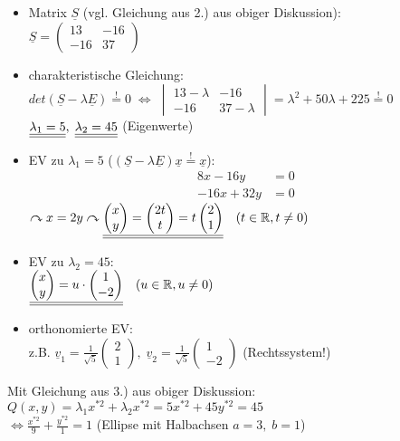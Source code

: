 \begin{itemize}
\item Matrix $\underline{S}$ (vgl. Gleichung aus 2.) aus obiger Diskussion):\\
$\underline{S}=\begin{pmatrix}
13 & -16\\
-16 & 37
\end{pmatrix}$
\item charakteristische Gleichung: \\
$det(\underline{S}-\lambda\underline{E})\overset{!}{=}0 \; \Leftrightarrow \; \begin{vmatrix}
13-\lambda & -16\\
-16 & 37-\lambda
\end{vmatrix}=\lambda^2+50\lambda+225\overset{!}{=}0$\\
$\underline{\underline{\lambda_1=5}}, \; \underline{\underline{\lambda_2 = 45}}$ (Eigenwerte)
\item EV zu $\lambda_1=5$ ($(\underline{S}-\lambda\underline{E})\underline{x}\overset{!}{=}\underline{x}$):
\begin{align*}
8x-16y &= 0\\
-16x+32y&=0
\end{align*}
$\curvearrowright x=2y \curvearrowright\underline{\underline{\begin{pmatrix}
x\\
y
\end{pmatrix}= \begin{pmatrix}
2t\\
t
\end{pmatrix}=t \begin{pmatrix}
2\\
1
\end{pmatrix}}} \quad (t \in \mathbb{R}, t\not = 0)$
\item EV zu $\lambda_2=45$:\\
$\underline{\underline{\begin{pmatrix}
x\\
y
\end{pmatrix}=u\cdot \begin{pmatrix}
1\\
-2
\end{pmatrix}}}\quad (u \in \mathbb{R}, u\not = 0)$
\item orthonomierte EV:\\
z.B. $\underline{v}_1=\frac{1}{\sqrt{5}}\begin{pmatrix}
2\\
1
\end{pmatrix}, \; \underline{v}_2=\frac{1}{\sqrt{5}}\begin{pmatrix}
1\\
-2
\end{pmatrix}$ (Rechtssystem!)
\end{itemize}
Mit Gleichung aus 3.) aus obiger Diskussion:\\
$Q(x,y)=\lambda_1x^{*2}+\lambda_2 x^{*2}=5x^{*2}+45y^{*2}=45$\\
$\Leftrightarrow \boxed{\frac{x^{*2}}{9}+\frac{y^{*2}}{1}=1}$ (Ellipse mit Halbachsen $a=3, \; b=1$)
\newpage
